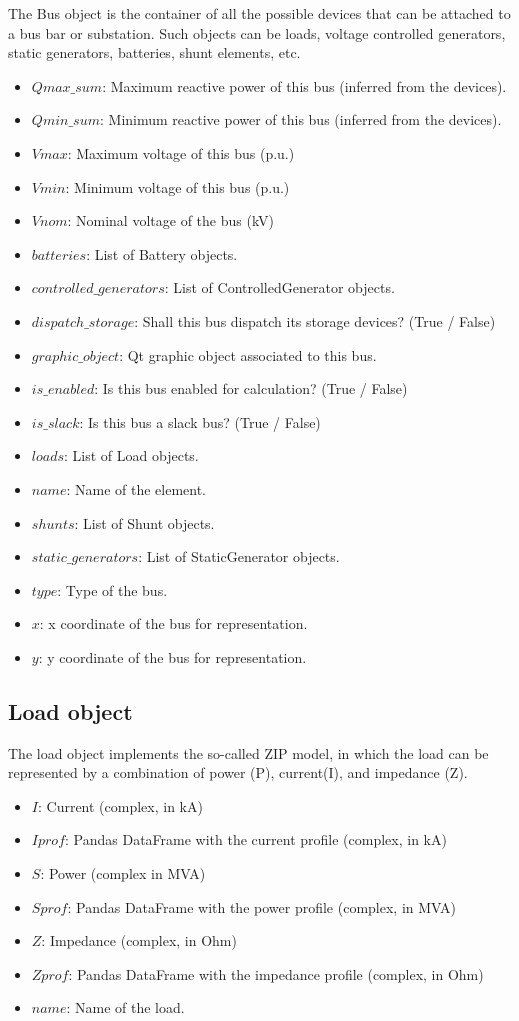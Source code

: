 \documentclass[11pt,fleqn]{book} %
\begin{document}
The Bus object is the container of all the possible devices that can be attached to a bus bar or substation. Such objects can be loads, voltage controlled generators, static generators, batteries, shunt elements, etc.

\begin{itemize}
	\item $Qmax\_sum$: Maximum reactive power of this bus (inferred from the devices).
	\item $Qmin\_sum$: Minimum reactive power of this bus (inferred from the devices).
	\item $Vmax$: Maximum voltage of this bus (p.u.)
	\item $Vmin$: Minimum voltage of this bus (p.u.)
	\item $Vnom$: Nominal voltage of the bus (kV)
	\item $batteries$: List of Battery objects.
	\item $controlled\_generators$: List of ControlledGenerator objects.
	\item $dispatch\_storage$: Shall this bus dispatch its storage devices?  (True / False)
	\item $graphic\_object$: Qt graphic object associated to this bus.
	\item $is\_enabled$: Is this bus enabled for calculation? (True / False)
	\item $is\_slack$: Is this bus a slack bus? (True / False)
	\item $loads$: List of Load objects.
	\item $name$: Name of the element.
	\item $shunts$: List of Shunt objects.
	\item $static\_generators$: List of StaticGenerator objects.
	\item $type$: Type of the bus.
	\item $x$: x coordinate of the bus for representation.
	\item $y$: y coordinate of the bus for representation.
\end{itemize}


\subsection{Load object}

The load object implements the so-called ZIP model, in which the load can be represented by a combination of power (P), current(I), and impedance (Z).

\begin{itemize}
	\item $I$: Current (complex, in kA)
	\item $Iprof$: Pandas DataFrame with the current profile (complex, in kA)
	\item $S$: Power (complex in MVA)
	\item $Sprof$: Pandas DataFrame with the power profile (complex, in MVA)
	\item $Z$: Impedance (complex, in Ohm)
	\item $Zprof$: Pandas DataFrame with the impedance profile (complex, in Ohm)
	\item $name$: Name of the load.
\end{itemize}
\end{document}
